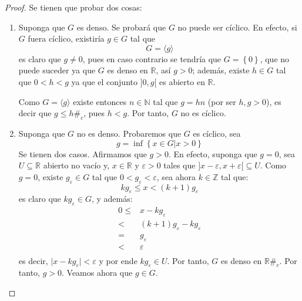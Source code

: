 \documentclass[12pt]{report}
\theoremstyle{largebreak}
\newcommand\abs[1]{\ensuremath{\big|#1\big|}}
\newcommand\contradiction{\ensuremath{\#_c}}
\newcommand\gen[1]{\ensuremath{\langle#1\rangle}}
\begin{document}
    \begin{proof}
        Se tienen que probar dos cosas:
        \begin{enumerate}
            \item Suponga que $G$ es denso. Se probará que $G$ no puede ser cíclico. En efecto, si $G$ fuera cíclico, existiría $g\in G$ tal que
            \begin{equation*}
                G=\gen{g}
            \end{equation*}
            es claro que $g\neq 0$, pues en caso contrario se tendría que $G=\left\{0\right\}$, que no puede suceder ya que $G$ es denso en $\mathbb{R}$, así $g>0$; además, existe $h\in G$ tal que $0<h<g$ ya que el conjunto $]0,g[$ es abierto en $\mathbb{R}$.

            Como $G=\gen{g}$ existe entonces $n\in\mathbb{N}$ tal que $g=hn$ (por ser $h,g>0$), es decir que $g\leq h$\contradiction, pues $h<g$. Por tanto, $G$ no es cíclico.

            \item Suponga que $G$ no es denso. Probaremos que $G$ es cíclico, sea
            \begin{equation*}
                g=\inf\left\{x\in G\Big|x>0 \right\}
            \end{equation*}
            Se tienen dos casos. Afirmamos que $g>0$. En efecto, suponga que $g=0$, sea $U\subseteq\mathbb{R}$ abierto no vacío y, $x\in\mathbb{R}$ y $\varepsilon>0$ tales que $]x-\varepsilon,x+\varepsilon[\subseteq U$. Como $g=0$, existe $g_\varepsilon\in G$ tal que $0<g_\varepsilon<\varepsilon$, sea ahora $k\in\mathbb{Z}$ tal que:
            \begin{equation*}
                kg_\varepsilon\leq x<(k+1)g_\varepsilon
            \end{equation*}
            es claro que $kg_\varepsilon\in G$, y además:
            \begin{equation*}
                \begin{split}
                    0\leq&x-kg_\varepsilon\\
                    <&(k+1)g_\varepsilon-kg_\varepsilon\\
                    =&g_\varepsilon\\
                    <&\varepsilon\\
                \end{split}
            \end{equation*}
            es decir, $\abs{x-kg_\varepsilon}<\varepsilon$ y por ende $kg_\varepsilon\in U$. Por tanto, $G$ es denso en $\mathbb{R}$\contradiction. Por tanto, $g>0$. Veamos ahora que $g\in G$.
            

\end{enumerate}
\end{proof}
\end{document}

